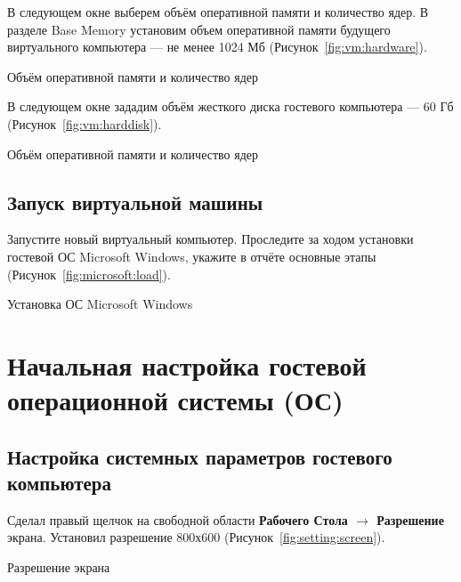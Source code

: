 В следующем окне выберем объём оперативной памяти и количество ядер.
В разделе Base Memory установим объем оперативной памяти будущего
виртуального компьютера --- не менее 1024 Мб (Рисунок~\ref{fig:vm:hardware}).

\begin{image}
	\caption{Объём оперативной памяти и количество ядер}
	\label{fig:vm:hardware}
\end{image}

В следующем окне зададим объём жесткого диска гостевого компьютера --- 60 Гб
(Рисунок~\ref{fig:vm:harddisk}).

\begin{image}
	\caption{Объём оперативной памяти и количество ядер}
	\label{fig:vm:harddisk}
\end{image}

\clearpage

\subsection{Запуск виртуальной машины}

Запустите новый виртуальный компьютер.
Проследите за ходом установки гостевой ОС Microsoft Windows,
укажите в отчёте основные этапы (Рисунок~\ref{fig:microsoft:load}).

\begin{image}
	\caption{Установка ОС Microsoft Windows}
	\label{fig:microsoft:load}
\end{image}

\clearpage

\section{Начальная настройка гостевой операционной системы (ОС)}

\subsection{Настройка системных параметров гостевого компьютера}

Сделал правый щелчок на свободной области
\textbf{Рабочего Стола $\rightarrow$ Разрешение} экрана.
Установил разрешение 800х600 (Рисунок~\ref{fig:setting:screen}).

\begin{image}
	\caption{Разрешение экрана}
	\label{fig:setting:screen}
\end{image}

